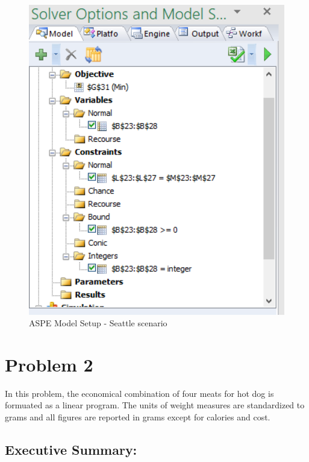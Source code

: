 \documentclass[]{article}
\begin{document}
\begin{figure}[h]

{\centering \includegraphics[width=4.93in]{Figures/Homework3/modelp1b} 

}

\caption{ASPE Model Setup - Seattle scenario}\label{fig:unnamed-chunk-5}
\end{figure}

\pagebreak

\section{Problem 2}\label{problem-2}

In this problem, the economical combination of four meats for hot dog is
formuated as a linear program. The units of weight measures are
standardized to grams and all figures are reported in grams except for
calories and cost.

\subsection{Executive Summary:}\label{executive-summary-1}
\end{document}
